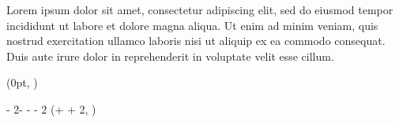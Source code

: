 \documentclass[11pt, a4paper]{resume}
\begin{document}
\makecvheader %


\begin{cvsummary}
    \begin{tcolorbox}[colback=white, rounded corners, boxrule=0pt, colframe=white]
    Lorem ipsum dolor sit amet, consectetur adipiscing elit, sed do eiusmod tempor incididunt ut labore et dolore magna aliqua. Ut enim ad minim veniam, quis nostrud exercitation ullamco laboris nisi ut aliquip ex ea commodo consequat. Duis aute irure dolor in reprehenderit in voluptate velit esse cillum.
    \end{tcolorbox}
\end{cvsummary}
\vspace{5mm}



\setlength{\headersmargin}{-0.2cm}
\setlength{\leftcolumnwidth}{5cm}
\setlength{\columnsmargin}{0.5\sidemargin}
\setlength{\timelinemargin}{0.5cm}

\begin{textblock*}{\leftcolumnwidth}(0pt, \headersmargin)
    \vspace{-2mm}
    
    \vspace{1mm}
    
\end{textblock*}

\begin{textblock*}
    {\paperwidth - 2\sidemargin - \leftcolumnwidth - \columnsmargin - 2\timelinemargin}
    (\leftcolumnwidth + \columnsmargin + 2\timelinemargin, \headersmargin)
    \vspace{-2mm}
    
\end{textblock*}
\end{document}
